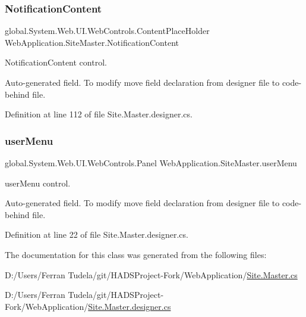 \mbox{\label{classWebApplication_1_1SiteMaster_ac0d3975658a8839098c53e1f37c8f1a5}} 
\subsubsection{\texorpdfstring{NotificationContent}{NotificationContent}}
{\footnotesize\ttfamily global.\+System.\+Web.\+U\+I.\+Web\+Controls.\+Content\+Place\+Holder Web\+Application.\+Site\+Master.\+Notification\+Content\hspace{0.3cm}{\ttfamily [protected]}}



Notification\+Content control. 

Auto-\/generated field. To modify move field declaration from designer file to code-\/behind file. 

Definition at line 112 of file Site.\+Master.\+designer.\+cs.

\mbox{\label{classWebApplication_1_1SiteMaster_a0c71f5770925f8c600ac941c4f258dec}} 
\subsubsection{\texorpdfstring{userMenu}{userMenu}}
{\footnotesize\ttfamily global.\+System.\+Web.\+U\+I.\+Web\+Controls.\+Panel Web\+Application.\+Site\+Master.\+user\+Menu\hspace{0.3cm}{\ttfamily [protected]}}



user\+Menu control. 

Auto-\/generated field. To modify move field declaration from designer file to code-\/behind file. 

Definition at line 22 of file Site.\+Master.\+designer.\+cs.



The documentation for this class was generated from the following files\+:\begin{DoxyCompactItemize}
\item 
D\+:/\+Users/\+Ferran Tudela/git/\+H\+A\+D\+S\+Project-\/\+Fork/\+Web\+Application/\mbox{\hyperlink{Site_8Master_8cs}{Site.\+Master.\+cs}}\item 
D\+:/\+Users/\+Ferran Tudela/git/\+H\+A\+D\+S\+Project-\/\+Fork/\+Web\+Application/\mbox{\hyperlink{Site_8Master_8designer_8cs}{Site.\+Master.\+designer.\+cs}}\end{DoxyCompactItemize}
